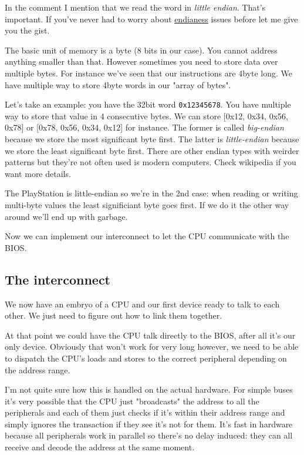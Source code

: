 \documentclass[a4paper]{article}
\newcommand{\code}[1] {\texttt{#1}}
\begin{document}
In the comment I mention that we read the word in \emph{little
  endian}. That's important. If you've never had to worry about
\href{https://en.wikipedia.org/wiki/Endianness}{endianess} issues
before let me give you the gist.

The basic unit of memory is a byte (8 bits in our case). You cannot
address anything smaller than that. However sometimes you need to
store data over multiple bytes. For instance we've seen that our
instructions are 4byte long. We have multiple way to store 4byte words
in our "array of bytes".

Let's take an example: you have the 32bit word
\code{0x12345678}. You have multiple way to store that value in 4
consecutive bytes. We can store [0x12, 0x34, 0x56, 0x78] or
[0x78, 0x56, 0x34, 0x12] for instance. The former is called
\emph{big-endian} because we store the most significant byte
first. The latter is \emph{little-endian} because we store the least
significant byte first. There are other endian types with weirder
patterns but they're not often used is modern computers. Check
wikipedia if you want more details.

The PlayStation is little-endian so we're in the 2nd case: when
reading or writing multi-byte values the least significiant byte goes
first. If we do it the other way around we'll end up with garbage.

Now we can implement our interconnect to let the CPU communicate with
the BIOS.

\subsection{The interconnect}

We now have an embryo of a CPU and our first device ready to talk to
each other. We just need to figure out how to link them together.

At that point we could have the CPU talk directly to the BIOS, after
all it's our only device. Obviously that won't work for very long
however, we need to be able to dispatch the CPU's loads and stores to
the correct peripheral depending on the address range.

I'm not quite sure how this is handled on the actual hardware. For
simple buses it's very possible that the CPU just "broadcasts" the
address to all the peripherals and each of them just checks if it's
within their address range and simply ignores the transaction if they
see it's not for them. It's fast in hardware because all peripherals
work in parallel so there's no delay induced: they can all receive and
decode the address at the same moment.
\end{document}
